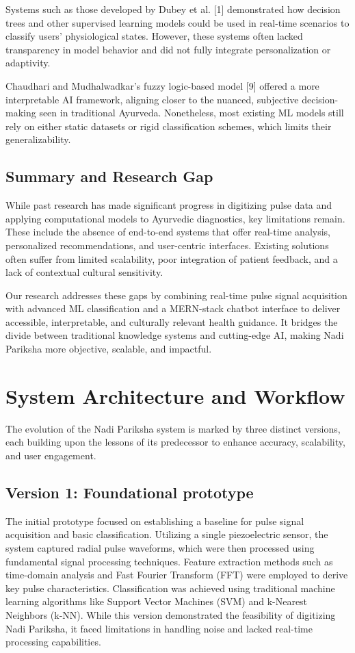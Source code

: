 \documentclass[10pt,twocolumn]{article}
\begin{document}
Systems such as those developed by Dubey et al. [1] demonstrated how decision trees and other supervised learning models could be used in real-time scenarios to classify users' physiological states. However, these systems often lacked transparency in model behavior and did not fully integrate personalization or adaptivity.

Chaudhari and Mudhalwadkar’s fuzzy logic-based model [9] offered a more interpretable AI framework, aligning closer to the nuanced, subjective decision-making seen in traditional Ayurveda. Nonetheless, most existing ML models still rely on either static datasets or rigid classification schemes, which limits their generalizability.

\subsection{Summary and Research Gap}
While past research has made significant progress in digitizing pulse data and applying computational models to Ayurvedic diagnostics, key limitations remain. These include the absence of end-to-end systems that offer real-time analysis, personalized recommendations, and user-centric interfaces. Existing solutions often suffer from limited scalability, poor integration of patient feedback, and a lack of contextual cultural sensitivity.

Our research addresses these gaps by combining real-time pulse signal acquisition with advanced ML classification and a MERN-stack chatbot interface to deliver accessible, interpretable, and culturally relevant health guidance. It bridges the divide between traditional knowledge systems and cutting-edge AI, making Nadi Pariksha more objective, scalable, and impactful.

\section{System Architecture and Workflow}
The evolution of the Nadi Pariksha system is marked by three distinct versions, each building upon the lessons of its predecessor to enhance accuracy, scalability, and user engagement.

\subsection{Version 1: Foundational prototype}
The initial prototype focused on establishing a baseline for pulse signal acquisition and basic classification. Utilizing a single piezoelectric sensor, the system captured radial pulse waveforms, which were then processed using fundamental signal processing techniques. Feature extraction methods such as time-domain analysis and Fast Fourier Transform (FFT) were employed to derive key pulse characteristics. Classification was achieved using traditional machine learning algorithms like Support Vector Machines (SVM) and k-Nearest Neighbors (k-NN). While this version demonstrated the feasibility of digitizing Nadi Pariksha, it faced limitations in handling noise and lacked real-time processing capabilities.
\end{document}
